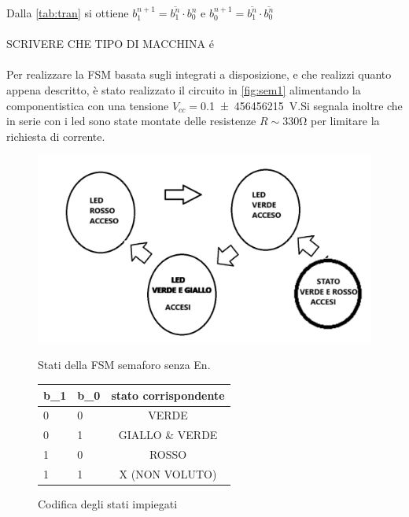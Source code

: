 \documentclass[a4paper,11pt]{article}
\begin{document}
Dalla \tablename{ \ref{tab:tran}} si ottiene  $b_{1}^{n+1} = \overline{b_{1}^{n}} \cdot b_{0}^{n}$ e $b_{0}^{n+1} = \overline{b_{1}^{n}} \cdot \overline{b_{0}^{n}}$
\\
\\
SCRIVERE CHE TIPO DI MACCHINA é
\\
\\
Per realizzare la FSM basata sugli integrati a disposizione, e che realizzi quanto appena descritto,
 è stato realizzato il circuito in \figurename{ \ref{fig:sem1}} alimentando la componentistica con una tensione 
 $V_{cc}=$\SI{0.1 \pm 456456215}{\volt}.Si segnala inoltre che in serie con i led sono state montate delle resistenze $R\sim 330$\si{\ohm} per limitare la richiesta di corrente.
\begin{figure}[h!]
	\begin{minipage}{0.5\textwidth}
		\centering
		\includegraphics[scale=0.20]{immagineM.png}
		\caption{Stati della FSM semaforo senza En.}
		\label{fig:stati}
	\end{minipage}
\begin{minipage}{0.5\textwidth}
	\centering
	\begin{tabular}{ssc}
	\toprule
	b_{1} & b_{0} & stato corrispondente\\
	 & 0 & VERDE\\
	0 & 1 & GIALLO \& VERDE\\
	1 & 0 & ROSSO\\
	1 & 1 &  X (NON VOLUTO)\\
	\bottomrule
	\end{tabular}
	\caption{Codifica degli stati impiegati}
	\label{tab:cod}
\end{minipage}
\end{figure}
\end{document}
